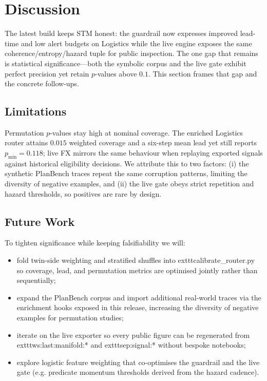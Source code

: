 \documentclass[11pt]{article}
\begin{document}
\section{Discussion}
The latest build keeps STM honest: the guardrail now expresses improved lead-time
and low alert budgets on Logistics while the live engine exposes the same 
coherence/entropy/hazard tuple for public inspection. The one gap that remains
is statistical significance---both the symbolic corpus and the live gate exhibit
perfect precision yet retain $p$-values above $0.1$. This section frames that gap
and the concrete follow-ups.
\subsection{Limitations}
Permutation $p$-values stay high at nominal coverage. The enriched Logistics
router attains $0.015$ weighted coverage and a six-step mean lead yet still
reports $p_{\min}=0.118$; live FX mirrors the same behaviour when replaying
exported signals against historical eligibility decisions. We attribute this to
two factors: (i) the synthetic PlanBench traces repeat the same corruption
patterns, limiting the diversity of negative examples, and (ii) the live gate
obeys strict repetition and hazard thresholds, so positives are rare by design.
\subsection{Future Work}
To tighten significance while keeping falsifiability we will:
\begin{itemize}
  \item fold twin-side weighting and stratified shuffles into
        	exttt{calibrate\_router.py} so coverage, lead, and permutation metrics are
        optimised jointly rather than sequentially;
  \item expand the PlanBench corpus and import additional real-world traces via
        the enrichment hooks exposed in this release, increasing the diversity of
        negative examples for permutation studies;
  \item iterate on the live exporter so every public figure can be regenerated
        from 	exttt{ws:last:manifold:*} and 	exttt{sep:signal:*} without bespoke
        notebooks;
  \item explore logistic feature weighting that co-optimises the guardrail and
        the live gate (e.g. predicate momentum thresholds derived from the hazard
        cadence).
\end{itemize}
\end{document}
